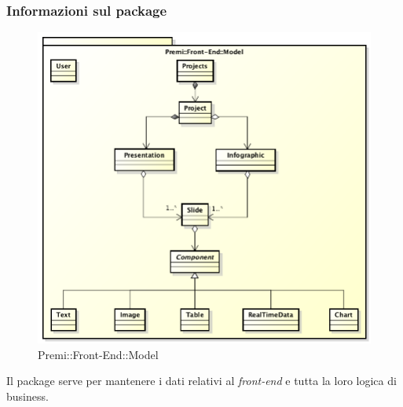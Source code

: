 \subsubsection*{Informazioni sul package}
\begin{figure}[h]
	\centering
	\includegraphics[width=0.9\linewidth]{img/front-end_model}
	\caption[Premi::Front-End::Model]{Premi::Front-End::Model}
\end{figure}
Il package serve per mantenere i dati relativi al \textit{\gls{front-end}} e tutta la loro logica di \gls{business}.

